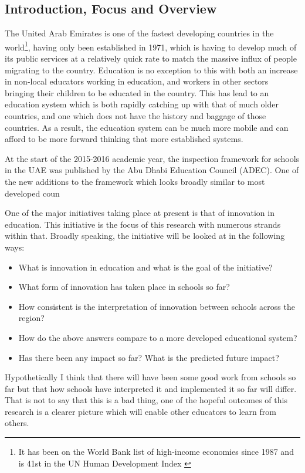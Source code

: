 \subsection{Introduction, Focus and Overview}

The United Arab Emirates is one of the fastest developing countries in the world\footnote{It has been on the World Bank list of high-income economies since 1987 \cite{worldbank} and is 41st in the UN Human Development Index \cite{WorkforHumanDevelopment2015}}, having only been established in 1971, which is having to develop much of its public services at a relatively quick rate to match the massive influx of people migrating to the country. Education is no exception to this with both an increase in non-local educators working in education, and workers in other sectors bringing their children to be educated in the country. This has lead to an education system which is both rapidly catching up with that of much older countries, and one which does not have the history and baggage of those countries. As a result, the education system can be much more mobile and can afford to be more forward thinking that more established systems. 

At the start of the 2015-2016 academic year, the inspection framework for schools in the UAE was published by the Abu Dhabi Education Council (ADEC). One of the new additions to the framework which looks broadly similar to most developed coun

One of the major initiatives taking place at present is that of innovation in education. This initiative is the focus of this research with numerous strands within that. Broadly speaking, the initiative will be looked at in the following ways: 

\begin{itemize}
\item What is innovation in education and what is the goal of the initiative?
\item What form of innovation has taken place in schools so far?
\item How consistent is the interpretation of innovation between schools across the region?
\item How do the above answers compare to a more developed educational system?
\item Has there been any impact so far? What is the predicted future impact?

\end{itemize}

Hypothetically I think that there will have been some good work from schools so far but that how schools have interpreted it and implemented it so far will differ. That is not to say that this is a bad thing, one of the hopeful outcomes of this research is a clearer picture which will enable other educators to learn from others.

